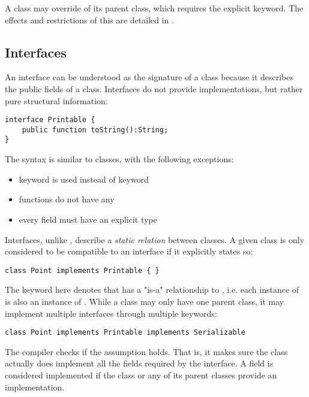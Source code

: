 A class may override  of its parent class, which requires the explicit  keyword. The effects and restrictions of this are detailed in .


\subsection{Interfaces}
\label{types-interfaces}

An interface can be understood as the signature of a class because it describes the public fields of a class. Interfaces do not provide implementations, but rather pure structural information:

\begin{lstlisting}
interface Printable {
	public function toString():String;
}
\end{lstlisting}
The syntax is similar to classes, with the following exceptions:

\begin{itemize}
	\item {} keyword is used instead of  keyword
	\item functions do not have any 
	\item every field must have an explicit type
\end{itemize}
Interfaces, unlike , describe a \emph{static relation} between classes. A given class is only considered to be compatible to an interface if it explicitly states so:

\begin{lstlisting}
class Point implements Printable { }
\end{lstlisting}
The  keyword here denotes that  has a "is-a" relationship to , i.e. each instance of  is also an instance of . While a class may only have one parent class, it may implement multiple interfaces through multiple  keywords:

\begin{lstlisting}
class Point implements Printable implements Serializable
\end{lstlisting}

The compiler checks if the  assumption holds. That is, it makes sure the class actually does implement all the fields required by the interface. A field is considered implemented if the class or any of its parent classes provide an implementation.

